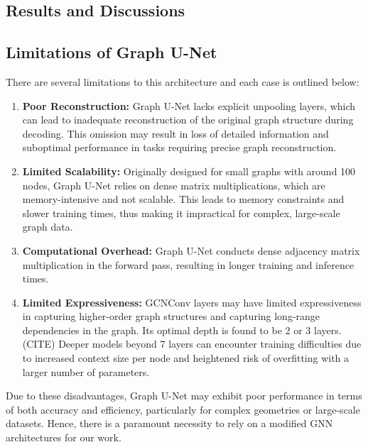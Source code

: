 \subsection{Results and Discussions}
\subsection{Limitations of Graph U-Net}
There are several limitations to this architecture and each case is outlined below: 
\begin{enumerate}
    \item \textbf{Poor Reconstruction:} Graph U-Net lacks explicit unpooling layers, which can lead to inadequate reconstruction of the original graph structure during decoding. This omission may result in loss of detailed information and suboptimal performance in tasks requiring precise graph reconstruction.
    \item \textbf{Limited Scalability:} Originally designed for small graphs with around 100 nodes, Graph U-Net relies on dense matrix multiplications, which are memory-intensive and not scalable. This leads to memory constraints and slower training times, thus making it impractical for complex, large-scale graph data.
    \item \textbf{Computational Overhead:} Graph U-Net conducts dense adjacency matrix multiplication in the forward pass, resulting in longer training and inference times.
    \item \textbf{Limited Expressiveness:} GCNConv layers may have limited expressiveness in capturing higher-order graph structures and capturing long-range dependencies in the graph. Its optimal depth is found to be 2 or 3 layers. (CITE) Deeper models beyond 7 layers can encounter training difficulties due to increased context size per node and heightened risk of overfitting with a larger number of parameters.
\end{enumerate}
Due to these disadvantages, Graph U-Net may exhibit poor performance in terms of both accuracy and efficiency, particularly for complex geometries or large-scale datasets. Hence, there is a paramount necessity to rely on a modified GNN architectures for our work.
